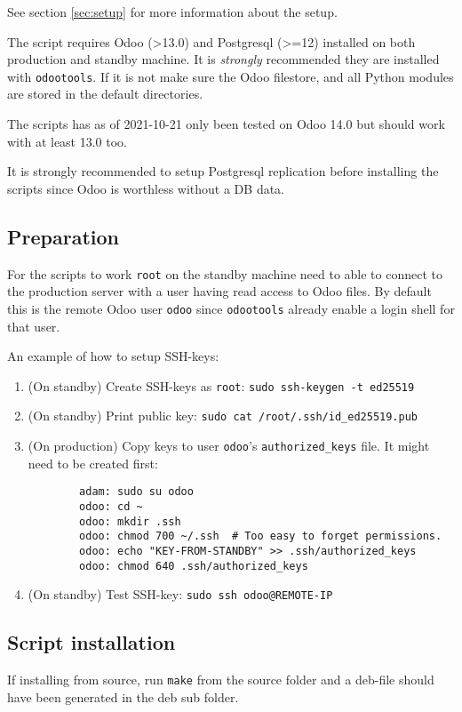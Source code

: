 \documentclass[a4paper]{article}
\begin{document}
See section \ref{sec:setup} for more information about the setup.

The script requires Odoo (>13.0) and Postgresql (>=12) installed on both production and standby machine. It is \emph{strongly} recommended they are installed with \texttt{odootools}. If it is not make sure the Odoo filestore, and all Python modules are stored in the default directories.

The scripts has as of 2021-10-21 only been tested on Odoo 14.0 but should work with at least 13.0 too.

It is strongly recommended to setup Postgresql replication before installing the scripts since Odoo is worthless without a DB data.

\subsection{Preparation}

For the scripts to work \texttt{root} on the standby machine need to able to connect to the production server with a user having read access to Odoo files. By default this is the remote Odoo user \texttt{odoo} since \texttt{odootools} already enable a login shell for that user.

An example of how to setup SSH-keys:
\begin{enumerate}
	\item (On standby) Create SSH-keys as \texttt{root}: \texttt{sudo ssh-keygen -t ed25519}
	\item (On standby) Print public key: \texttt{sudo cat /root/.ssh/id\_ed25519.pub}
	\item (On production) Copy keys to user \texttt{odoo}'s \texttt{authorized\_keys} file. It might need to be created first:
	\begin{verbatim}
		adam: sudo su odoo
		odoo: cd ~
		odoo: mkdir .ssh
		odoo: chmod 700 ~/.ssh  # Too easy to forget permissions.
		odoo: echo "KEY-FROM-STANDBY" >> .ssh/authorized_keys
		odoo: chmod 640 .ssh/authorized_keys
	\end{verbatim}
	\item (On standby) Test SSH-key: \texttt{sudo ssh odoo@REMOTE-IP}
\end{enumerate}

\subsection{Script installation}
	If installing from source, run \texttt{make} from the source folder and a deb-file should have been generated in the deb sub folder.
	
\end{document}
